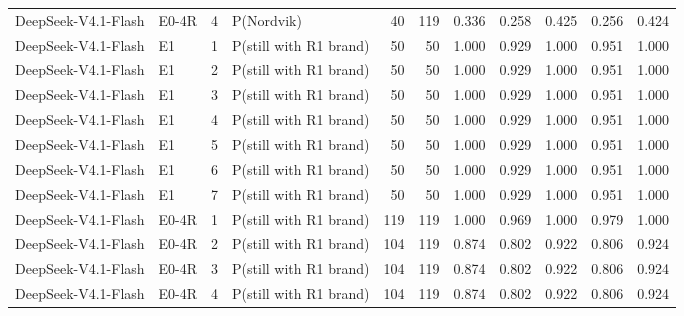 \begin{table}[htbp]
\begin{tabular}{llrlrrrrrrr}
DeepSeek-V4.1-Flash & E0-4R & 4 & P(Nordvik) & 40 & 119 & 0.336 & 0.258 & 0.425 & 0.256 & 0.424 \\
DeepSeek-V4.1-Flash & E1 & 1 & P(still with R1 brand) & 50 & 50 & 1.000 & 0.929 & 1.000 & 0.951 & 1.000 \\
DeepSeek-V4.1-Flash & E1 & 2 & P(still with R1 brand) & 50 & 50 & 1.000 & 0.929 & 1.000 & 0.951 & 1.000 \\
DeepSeek-V4.1-Flash & E1 & 3 & P(still with R1 brand) & 50 & 50 & 1.000 & 0.929 & 1.000 & 0.951 & 1.000 \\
DeepSeek-V4.1-Flash & E1 & 4 & P(still with R1 brand) & 50 & 50 & 1.000 & 0.929 & 1.000 & 0.951 & 1.000 \\
DeepSeek-V4.1-Flash & E1 & 5 & P(still with R1 brand) & 50 & 50 & 1.000 & 0.929 & 1.000 & 0.951 & 1.000 \\
DeepSeek-V4.1-Flash & E1 & 6 & P(still with R1 brand) & 50 & 50 & 1.000 & 0.929 & 1.000 & 0.951 & 1.000 \\
DeepSeek-V4.1-Flash & E1 & 7 & P(still with R1 brand) & 50 & 50 & 1.000 & 0.929 & 1.000 & 0.951 & 1.000 \\
DeepSeek-V4.1-Flash & E0-4R & 1 & P(still with R1 brand) & 119 & 119 & 1.000 & 0.969 & 1.000 & 0.979 & 1.000 \\
DeepSeek-V4.1-Flash & E0-4R & 2 & P(still with R1 brand) & 104 & 119 & 0.874 & 0.802 & 0.922 & 0.806 & 0.924 \\
DeepSeek-V4.1-Flash & E0-4R & 3 & P(still with R1 brand) & 104 & 119 & 0.874 & 0.802 & 0.922 & 0.806 & 0.924 \\
DeepSeek-V4.1-Flash & E0-4R & 4 & P(still with R1 brand) & 104 & 119 & 0.874 & 0.802 & 0.922 & 0.806 & 0.924 \\
\bottomrule
\end{tabular}
\end{table}
